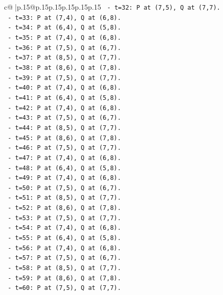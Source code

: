 \documentclass{article}
\begin{document}
{\begin{supertabular}{c@{$\;$}|p{.15\linewidth}@{}p{.15\linewidth}p{.15\linewidth}p{.15\linewidth}p{.15\linewidth}p{.15\linewidth}}
{{{\texttt{      {-} t=32: P at (7,5), Q at (7,7).} \\
\texttt{      {-} t=33: P at (7,4), Q at (6,8).} \\
\texttt{      {-} t=34: P at (6,4), Q at (5,8).} \\
\texttt{      {-} t=35: P at (7,4), Q at (6,8).} \\
\texttt{      {-} t=36: P at (7,5), Q at (6,7).} \\
\texttt{      {-} t=37: P at (8,5), Q at (7,7).} \\
\texttt{      {-} t=38: P at (8,6), Q at (7,8).} \\
\texttt{      {-} t=39: P at (7,5), Q at (7,7).} \\
\texttt{      {-} t=40: P at (7,4), Q at (6,8).} \\
\texttt{      {-} t=41: P at (6,4), Q at (5,8).} \\
\texttt{      {-} t=42: P at (7,4), Q at (6,8).} \\
\texttt{      {-} t=43: P at (7,5), Q at (6,7).} \\
\texttt{      {-} t=44: P at (8,5), Q at (7,7).} \\
\texttt{      {-} t=45: P at (8,6), Q at (7,8).} \\
\texttt{      {-} t=46: P at (7,5), Q at (7,7).} \\
\texttt{      {-} t=47: P at (7,4), Q at (6,8).} \\
\texttt{      {-} t=48: P at (6,4), Q at (5,8).} \\
\texttt{      {-} t=49: P at (7,4), Q at (6,8).} \\
\texttt{      {-} t=50: P at (7,5), Q at (6,7).} \\
\texttt{      {-} t=51: P at (8,5), Q at (7,7).} \\
\texttt{      {-} t=52: P at (8,6), Q at (7,8).} \\
\texttt{      {-} t=53: P at (7,5), Q at (7,7).} \\
\texttt{      {-} t=54: P at (7,4), Q at (6,8).} \\
\texttt{      {-} t=55: P at (6,4), Q at (5,8).} \\
\texttt{      {-} t=56: P at (7,4), Q at (6,8).} \\
\texttt{      {-} t=57: P at (7,5), Q at (6,7).} \\
\texttt{      {-} t=58: P at (8,5), Q at (7,7).} \\
\texttt{      {-} t=59: P at (8,6), Q at (7,8).} \\
\texttt{      {-} t=60: P at (7,5), Q at (7,7).} \\
}}}
\end{supertabular}}
\end{document}
